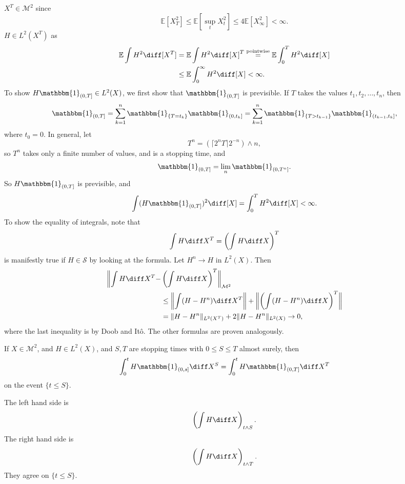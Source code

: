 \documentclass[12pt]{article}
\begin{document}
\begin{proofbox}
	$X^T \in \mathcal{M}^2$ since
	\[
	\mathbb{E}[X_T^2] \leq \mathbb{E}[ \sup_t X_t^2] \leq 4 \mathbb{E}[X_\infty^2] < \infty.
	\]
	$H \in L^2(X^{T})$ as
	\begin{align*}
		\mathbb{E} \int H^2 \diff [X^{T}] &= \mathbb{E} \int H^2 \diff [X]^{T} \overset{\text{pointwise}}= \mathbb{E} \int_0^{T} H^2 \diff [X] \\
						  &\leq \mathbb{E} \int_0^\infty H^2 \diff [X] < \infty.
	\end{align*}
	To show $H \mathbbm{1}_{(0, T]} \in L^2(X)$, we first show that $\mathbbm{1}_{(0, T]}$ is previsible. If $T$ takes the values $t_1, t_2, \ldots, t_n$, then
	\[
		\mathbbm{1}_{(0, T]} = \sum_{k = 1}^{n} \mathbbm{1}_{\{T = t_k\}} \mathbbm{1}_{(0, t_k]} = \sum_{k = 1}^{n} \mathbbm{1}_{\{T > t_{k-1}\}} \mathbbm{1}_{(t_{k-1}, t_k]},
	\]
	where $t_0 = 0$. In general, let
	\[
	T^{n} = (\lceil 2^{n} T \rceil 2^{-n} ) \wedge n,
	\]
	so $T^{n}$ takes only a finite number of values, and is a stopping time, and
	\[
		\mathbbm{1}_{(0, T]} = \lim_n \mathbbm{1}_{(0, T^{n}]}.
	\]
	So $H \mathbbm{1}_{(0, T]}$ is previsible, and
	\[
		\int (H \mathbbm{1}_{(0, T]})^2 \diff [X] = \int_0^T H^2 \diff [X] < \infty.
	\]
	To show the equality of integrals, note that
	\[
	\int H \diff X^{T} = \left( \int H \diff X \right)^{T}
	\]
	is manifestly true if $H \in \mathcal{S}$ by looking at the formula. Let $H^{n} \to H$ in $L^2(X)$. Then
	\begin{align*}
		\biggl\|\int H \diff X^{T} - &\left( \int H \diff X \right)^{T}\biggr\|_{\mathcal{M}^2} \\
		&\leq \biggl\|\int (H - H^{n}) \diff X^{T}\biggr\| + \biggl\| \left( \int (H - H^{n}) \diff X \right)^{T}\biggr\| \\
												       &= \|H - H^{n}\|_{L^2(X^{T})} + 2 \|H - H^{n}\|_{L^2(X)} \to 0,
	\end{align*}
	where the last inequality is by Doob and It\^o. The other formulas are proven analogously.
\end{proofbox}

\begin{proposition}
	If $X \in \mathcal{M}^2$, and $H \in L^2(X)$, and $S, T$ are stopping times with $0 \leq S \leq T$ almost surely, then
	\[
		\int_0^{t} H \mathbbm{1}_{(0, s]} \diff X^{S} = \int_0^{t} H \mathbbm{1}_{(0, T]} \diff X^{T}
	\]
	on the event $\{t \leq S\}$.
\end{proposition}

\begin{proofbox}
	The left hand side is
	\[
	\left( \int H \diff X \right)_{t \wedge S}.
	\]
	The right hand side is
	\[
	\left( \int H \diff X \right)_{t \wedge T}.
	\]
	They agree on $\{t \leq S\}$.
\end{proofbox}
\end{document}
